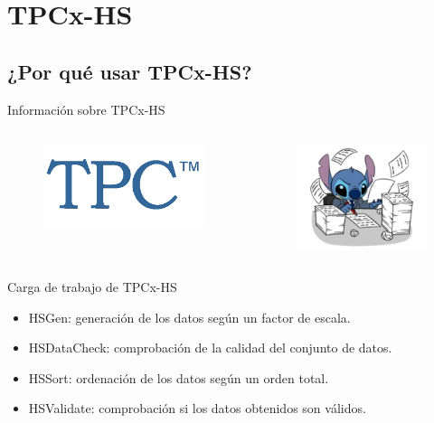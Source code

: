 
\section{TPCx-HS}

	\subsection*{¿Por qué usar TPCx-HS?}

		\begin{frame}{Información sobre TPCx-HS}
			\begin{columns}[c]
				\begin{figure}[h]
					\centering
					\includegraphics[width=5cm]{./Images/tpc-logo.png}
				\end{figure}
			
			
				\begin{figure}[H]
							\centering
							\includegraphics[width=4cm]{./Images/hardwork.png}
						\end{figure}
					\end{columns}
			
			{\color{ChetwodeBlue}\large Carga de trabajo de TPCx-HS}
			
			\begin{itemize}
				\item HSGen: generación de los datos según un factor de escala.
				\item HSDataCheck: comprobación de la calidad del conjunto de datos.
				\item HSSort: ordenación de los datos según un orden total.
				\item HSValidate: comprobación si los datos obtenidos son válidos.
			\end{itemize}		
		\end{frame}
	
